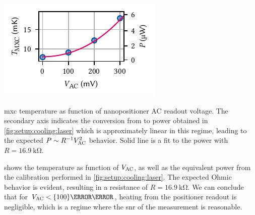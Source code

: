 \begin{marginfigure}
    \centering
    \includegraphics{img/pdf/setup/anc_readout_heating}
    \caption[]{
        \Acrlong{mxc} temperature as function of nanopositioner AC readout voltage.
        The secondary axis indicates the conversion from \Tmxc to power obtained in \cref{fig:setup:cooling:laser} which is approximately linear in this regime, leading to the expected $P\sim R^{-1} V_{\mathrm{AC}}^2$ behavior.
        Solid line is a fit to the power with $R=\qty{16.9}{\kilo\ohm}$.
    }
    \label{fig:setup:cooling:anc}
\end{marginfigure}

 shows the temperature as function of $V_{\mathrm{AC}}$, as well as the equivalent power from the calibration performed in \cref{fig:setup:cooling:laser}.
The expected Ohmic behavior is evident, resulting in a resistance of $R=\qty{16.9}{\kilo\ohm}$.
We can conclude that for $V_{\mr{AC}} < \qty{100}{\milli\volt}$, heating from the positioner readout is negligible, which is a regime where the \gls{snr} of the measurement is reasonable.

